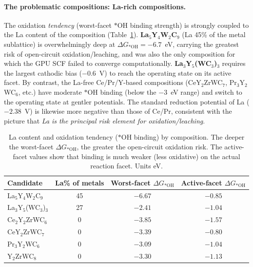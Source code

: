\documentclass[11pt,a4paper]{report}
\begin{document}
\paragraph{The problematic compositions: La-rich compositions.} The oxidation \emph{tendency} (worst-facet $*$OH
binding strength) is strongly coupled to the La content of the composition (Table~\ref{tab:poison}).
\textbf{La$_5$Y$_4$W$_2$C$_9$} (La 45\% of the metal sublattice) is overwhelmingly deep at
$\Delta G_{*\mathrm{OH}}=-6.7$~eV, carrying the greatest risk of open-circuit oxidation/leaching, and was also
the only composition for which the GPU SCF failed to converge computationally. \textbf{La$_3$Y$_5$(WC$_3$)$_3$}
requires the largest cathodic bias ($-0.6$~V) to reach the operating state on its active facet. By contrast, the
La-free Ce/Pr/Y-based compositions (CeY$_2$ZrWC$_7$, Pr$_3$Y$_2$WC$_6$, etc.) have moderate $*$OH binding (below
the $-3$~eV range) and switch to the operating state at gentler potentials. The standard reduction potential of
La ($-2.38$~V) is likewise more negative than those of Ce/Pr, consistent with the picture that \emph{La is the
principal risk element for oxidation/leaching}.

\begin{table}[t]
\centering
\caption{La content and oxidation tendency ($*$OH binding) by composition. The deeper the worst-facet
$\Delta G_{*\mathrm{OH}}$, the greater the open-circuit oxidation risk. The active-facet values show that binding
is much weaker (less oxidative) on the actual reaction facet. Units eV.}
\label{tab:poison}
\small
\begin{tabular}{lccc}
\hline
Candidate & La\% of metals & Worst-facet $\Delta G_{*\mathrm{OH}}$ & Active-facet $\Delta G_{*\mathrm{OH}}$ \\
\hline
La$_5$Y$_4$W$_2$C$_9$ & 45 & $-6.67$ & $-0.85$ \\
La$_3$Y$_5$(WC$_3$)$_3$ & 27 & $-2.41$ & $-1.04$ \\
Ce$_2$Y$_2$ZrWC$_6$ & 0 & $-3.85$ & $-1.57$ \\
CeY$_2$ZrWC$_7$ & 0 & $-3.39$ & $-0.80$ \\
Pr$_3$Y$_2$WC$_6$ & 0 & $-3.09$ & $-1.04$ \\
Y$_2$ZrWC$_8$ & 0 & $-3.30$ & $-1.13$ \\
\hline
\end{tabular}
\end{table}
\end{document}
